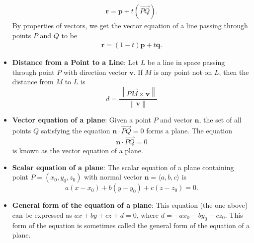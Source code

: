 \documentclass{report}
\begin{document}
\begin{itemize}
\begin{align*}
            \mathbf{r} = \mathbf{p} + t\left(\vec{PQ}\right)
        .\end{align*} 
        By properties of vectors, we get the vector equation of a line passing through points $P$ and $Q$ to be 
        \begin{align*}
            \mathbf{r} = (1-t)\mathbf{p} + t\mathbf{q}
        .\end{align*}
        \item \textbf{Distance from a Point to a Line}:
            Let $L$ be a line in space passing through point $P$ with direction vector $\mathbf{v}$. If $M$ is any point not on $L$, then the distance from $M$ to $L$ is
            \[
                d = \frac{\left\| \overrightarrow{PM} \times \mathbf{v} \right\|}{\left\| \mathbf{v} \right\|}
            \]
        \item \textbf{Vector equation of a plane}:
            Given a point $P$ and vector $\mathbf{n}$, the set of all points $Q$ satisfying the equation $\mathbf{n} \cdot \overrightarrow{PQ} = 0$ forms a plane. The equation
            \[
                \mathbf{n} \cdot \overrightarrow{PQ} = 0
            \]
            is known as the vector equation of a plane.
    \item \textbf{Scalar equation of a plane}:
        The scalar equation of a plane containing point $P=(x_0, y_0, z_0)$ with normal vector $\mathbf{n}=\langle a, b, c \rangle$ is
        \[
            a(x-x_0) + b(y-y_0) + c(z-z_0) = 0.
        \]
    \item \textbf{General form of the equation of a plane}:
        This equation (the one above) can be expressed as $ax + by + cz + d = 0$, where $d = -ax_0 - by_0 - cz_0$. This form of the equation is sometimes called the general form of the equation of a plane.



    \end{itemize}
\end{document}
